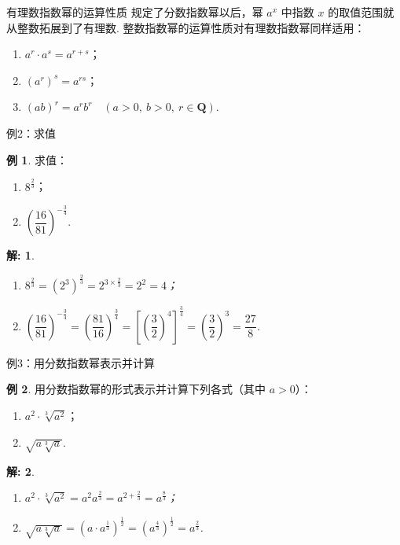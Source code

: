 \documentclass[aspectratio=169,13pt,t,fleqn] {beamer}
\newtheorem*{solve}{解:}
\theoremstyle{definition}
\newtheorem{exam}{例}
\begin{document}
\begin{frame}{有理数指数幂的运算性质}
	规定了分数指数幂以后，幂 \(a^x\) 中指数 \(x\) 的取值范围就从整数拓展到了有理数. 整数指数幂的运算性质对有理数指数幂同样适用：
	\vspace{1em}
	\begin{summarybox}
		\begin{enumerate}[(1)]
			\item \(a^r\cdot a^s=a^{r+s}\)；
			\item \((a^r)^s=a^{rs}\)；
			\item \((ab)^r=a^r b^r\quad (a>0,\ b>0,\ r\in \mathbf{Q})\).
		\end{enumerate}
	\end{summarybox}
\end{frame}

\begin{frame}{例2：求值}
	\begin{exam}
		求值：
		\begin{enumerate}[(1)]
			\item \(8^{\frac{2}{3}}\)；
			\item \(\left(\dfrac{16}{81}\right)^{-\frac{3}{4}}\).
		\end{enumerate}
	\end{exam}
	\pause
	\begin{solve}
		\begin{enumerate}[(1)]
			\item \(8^{\frac{2}{3}}=(2^3)^{\frac{2}{3}}=2^{3\times \frac{2}{3}}=2^2=4\)；
			\item \(\left(\dfrac{16}{81}\right)^{-\frac{3}{4}}=\left(\dfrac{81}{16}\right)^{\frac{3}{4}}=\left[\left(\dfrac{3}{2}\right)^4\right]^{\frac{3}{4}}=\left(\dfrac{3}{2}\right)^3=\dfrac{27}{8}\).
		\end{enumerate}
	\end{solve}
\end{frame}

\begin{frame}{例3：用分数指数幂表示并计算}
	\begin{exam}
		用分数指数幂的形式表示并计算下列各式（其中 \(a>0\)）：
		\begin{enumerate}[(1)]
			\item \(a^2\cdot \sqrt[3]{a^2}\)；
			\item \(\sqrt{a\sqrt[3]{a}}\).
		\end{enumerate}
	\end{exam}
	\pause
	\begin{solve}
		\begin{enumerate}[(1)]
			\item \(a^2\cdot \sqrt[3]{a^2}=a^2 a^{\frac{2}{3}}=a^{2+\frac{2}{3}}=a^{\frac{8}{3}}\)；
			\item \(\sqrt{a\sqrt[3]{a}}=(a\cdot a^{\frac{1}{3}})^{\frac{1}{2}}=(a^{\frac{4}{3}})^{\frac{1}{2}}=a^{\frac{2}{3}}\).
		\end{enumerate}
	\end{solve}
\end{frame}
\end{document}
